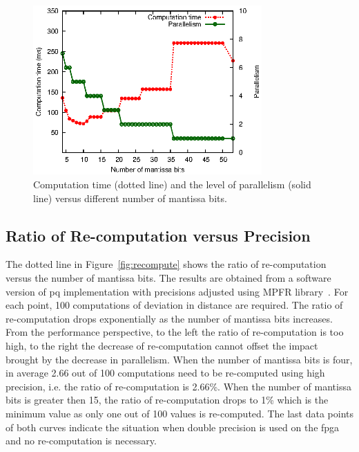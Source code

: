 \begin{figure}[ht]
\begin{center}
\includegraphics[width=0.78\textwidth]{3_precision/figures/fig_exectime}
\end{center}
\caption[Computation time and the level of parallelism versus different number of mantissa bits.]{Computation time (dotted line) and the level of parallelism (solid line) versus different number of mantissa bits.}
\label{fig:exectime}
\end{figure}

\subsection{Ratio of Re-computation versus Precision}
\label{sec:precision_recompute}
The dotted line in Figure~\ref{fig:recompute} shows the ratio of re-computation versus the number of mantissa bits.
The results are obtained from a software version of \gls{pq} implementation with precisions adjusted using MPFR library~\cite{fousse07}.
For each point, 100 computations of deviation in distance are required.
The ratio of re-computation drops exponentially as the number of mantissa bits increases.
From the performance perspective, to the left the ratio of re-computation is too high, to the right the decrease of re-computation cannot offset the impact brought by the decrease in parallelism.
When the number of mantissa bits is four, in average 2.66 out of 100 computations need to be re-computed using high precision, i.e. the ratio of re-computation is 2.66\%.
When the number of mantissa bits is greater then 15, the ratio of re-computation drops to 1\% which is the minimum value as only one out of 100 values is re-computed.
The last data points of both curves indicate the situation when double precision is used on the \gls{fpga} and no re-computation is necessary.

